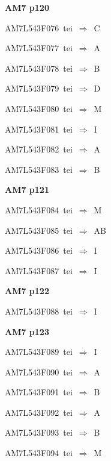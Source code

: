 \par\vfill\eject
{\bf\hfill AM7 p120\hfill\hbox{}}\par\bigskip
{\sixrm AM7L543F076\ {\sixit tei}\ }$\Rightarrow$\ C\par\smallskip
{\sixrm AM7L543F077\ {\sixit tei}\ }$\Rightarrow$\ A\par\smallskip
{\sixrm AM7L543F078\ {\sixit tei}\ }$\Rightarrow$\ B\par\smallskip
{\sixrm AM7L543F079\ {\sixit tei}\ }$\Rightarrow$\ D\par\smallskip
{\sixrm AM7L543F080\ {\sixit tei}\ }$\Rightarrow$\ M\par\smallskip
{\sixrm AM7L543F081\ {\sixit tei}\ }$\Rightarrow$\ I\par\smallskip
{\sixrm AM7L543F082\ {\sixit tei}\ }$\Rightarrow$\ A\par\smallskip
{\sixrm AM7L543F083\ {\sixit tei}\ }$\Rightarrow$\ B\par\smallskip

\par\vfill\eject
{\bf\hfill AM7 p121\hfill\hbox{}}\par\bigskip
{\sixrm AM7L543F084\ {\sixit tei}\ }$\Rightarrow$\ M\par\smallskip
{\sixrm AM7L543F085\ {\sixit tei}\ }$\Rightarrow$\ AB\par\smallskip
{\sixrm AM7L543F086\ {\sixit tei}\ }$\Rightarrow$\ I\par\smallskip
{\sixrm AM7L543F087\ {\sixit tei}\ }$\Rightarrow$\ I\par\smallskip

\par\vfill\eject
{\bf\hfill AM7 p122\hfill\hbox{}}\par\bigskip
{\sixrm AM7L543F088\ {\sixit tei}\ }$\Rightarrow$\ I\par\smallskip

\par\vfill\eject
{\bf\hfill AM7 p123\hfill\hbox{}}\par\bigskip
{\sixrm AM7L543F089\ {\sixit tei}\ }$\Rightarrow$\ I\par\smallskip
{\sixrm AM7L543F090\ {\sixit tei}\ }$\Rightarrow$\ A\par\smallskip
{\sixrm AM7L543F091\ {\sixit tei}\ }$\Rightarrow$\ B\par\smallskip
{\sixrm AM7L543F092\ {\sixit tei}\ }$\Rightarrow$\ A\par\smallskip
{\sixrm AM7L543F093\ {\sixit tei}\ }$\Rightarrow$\ B\par\smallskip
{\sixrm AM7L543F094\ {\sixit tei}\ }$\Rightarrow$\ M\par\smallskip

